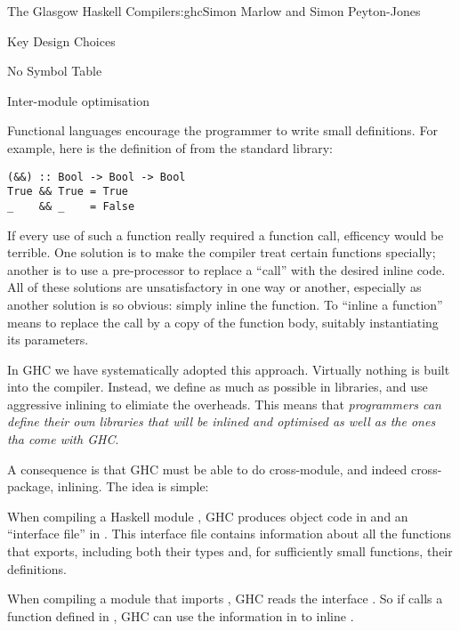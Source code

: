 \begin{aosachapter}{The Glasgow Haskell Compiler}{s:ghc}{Simon Marlow and Simon Peyton-Jones}
\begin{aosasect1}{Key Design Choices}
\begin{aosasect2}{No Symbol Table}
\end{aosasect2}

\begin{aosasect2}{Inter-module optimisation}

Functional languages encourage the programmer to write small
definitions.  For example, here is the definition of \code{\&\&} from
the standard library:

\begin{verbatim}
(&&) :: Bool -> Bool -> Bool
True && True = True
_    && _    = False
\end{verbatim}

If every use of such a function really required a function call,
efficency would be terrible.  One solution is to make the compiler
treat certain functions specially; another is to use a pre-processor
to replace a ``call'' with the desired inline code.  All of these
solutions are unsatisfactory in one way or another, especially as
another solution is so obvious: simply inline the function.  To
``inline a function'' means to replace the call by a copy of the
function body, suitably instantiating its parameters.

In GHC we have systematically adopted this approach.  Virtually
nothing is built into the compiler.  Instead, we define as much as
possible in libraries, and use aggressive inlining to elimiate the
overheads.  This means that \emph{programmers can define their own
  libraries that will be inlined and optimised as well as the ones tha
  come with GHC}.

A consequence is that GHC must be able to do cross-module, and indeed
cross-package, inlining.  The idea is simple:

\begin{aosaitemize}

\item When compiling a Haskell module , GHC produces
  object code in  and an ``interface file'' in
  .  This interface file contains information about all
  the functions that  exports, including both their types
  and, for sufficiently small functions, their definitions.

\item When compiling a module  that imports
  , GHC reads the interface .  So if
   calls a function  defined in ,
  GHC can use the information in  to inline .

\end{aosaitemize}


\end{aosasect2}
\end{aosasect1}
\end{aosachapter}
